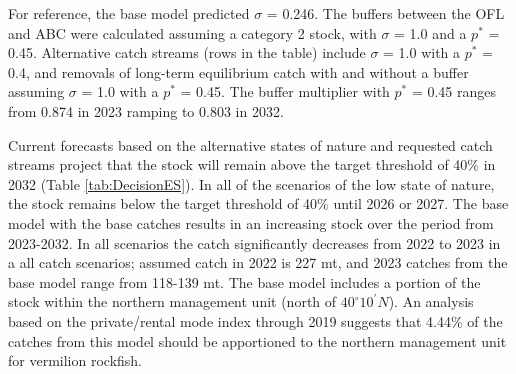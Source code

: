 \documentclass[11pt,
  english,
  a4paper,
]{article}
\begin{document}
For reference, the base model predicted {\(\sigma\)\leavevmode\tagmcend\tagstructend} = 0.246. The buffers between the OFL and ABC were calculated assuming a category 2 stock, with {\(\sigma\)\leavevmode\tagmcend\tagstructend} = 1.0 and a {\(p^*\)\leavevmode\tagmcend\tagstructend} = 0.45. Alternative catch streams (rows in the table) include {\(\sigma\)\leavevmode\tagmcend\tagstructend} = 1.0 with a {\(p^*\)\leavevmode\tagmcend\tagstructend} = 0.4, and removals of long-term equilibrium catch with and without a buffer assuming {\(\sigma\)\leavevmode\tagmcend\tagstructend} = 1.0 with a {\(p^*\)\leavevmode\tagmcend\tagstructend} = 0.45. The buffer multiplier with {\(p^*\)\leavevmode\tagmcend\tagstructend} = 0.45 ranges from 0.874 in 2023 ramping to 0.803 in 2032.

Current forecasts based on the alternative states of nature and requested catch streams project that the stock will remain above the target threshold of 40\% in 2032 (Table \ref{tab:DecisionES}). In all of the scenarios of the low state of nature,\\
the stock remains below the target threshold of 40\% until 2026 or 2027. The base model with the base catches results in an increasing stock over the period from 2023-2032. In all scenarios the catch significantly decreases from 2022 to 2023 in a all catch scenarios; assumed catch in 2022 is 227 mt, and 2023 catches from the base model range from 118-139 mt. The base model includes a portion of the stock within the northern management unit (north of $40^\circ 10^\prime N$). An analysis based on the private/rental mode index through 2019 suggests that 4.44\% of the catches from this model should be apportioned to the northern management unit for vermilion rockfish.
\end{document}
